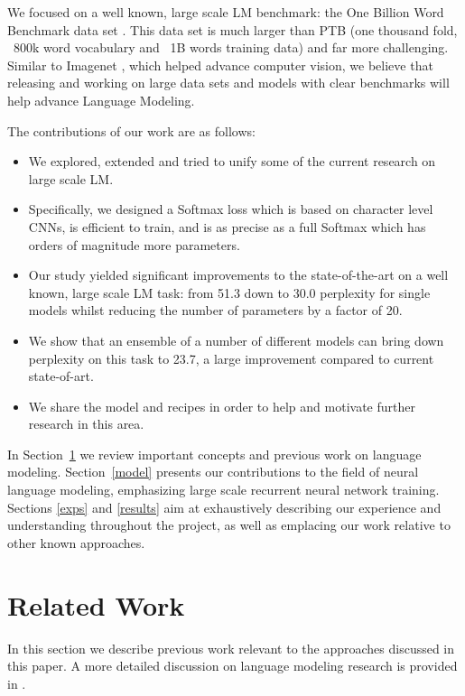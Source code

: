 \documentclass{article}
\begin{document}
We focused on a well known, large scale LM benchmark: the One Billion Word Benchmark data set \cite{chelba2013one}. This data set is much larger than PTB (one thousand fold, ~800k word vocabulary and ~1B words training data) and far more challenging. Similar to Imagenet \cite{deng2009imagenet}, which helped advance computer vision, we believe that releasing and working on large data sets and models with clear benchmarks will help advance Language Modeling.

The contributions of our work are as follows:

\begin{itemize}
\item We explored, extended and tried to unify some of the current research on large scale LM.
\item Specifically, we designed a Softmax loss which is based on character level CNNs, is efficient to train, and is as precise as a full Softmax which has orders of magnitude more parameters.
\item Our study yielded significant improvements to the state-of-the-art on a well known, large scale LM task: from 51.3 down to 30.0 perplexity for single models whilst reducing the number of parameters by a factor of 20.
\item We show that an ensemble of a number of different models can bring down perplexity on this task to 23.7, a large improvement compared to current state-of-art.
\item We share the model and recipes in order to help and motivate further research in this area.
\end{itemize}

In Section~\ref{relwork} we review important concepts and previous work on language modeling. Section~\ref{model} presents our contributions to the field of neural language modeling, emphasizing large scale recurrent neural network training. Sections \ref{exps} and \ref{results} aim at exhaustively describing our experience and understanding throughout the project, as well as emplacing our work relative to other known approaches.
 \section{Related Work}
\label{relwork}

In this section we describe previous work relevant to the approaches discussed in this paper. A more detailed discussion on language modeling research is provided in \cite{mikolov2012statistical}.
\end{document}
